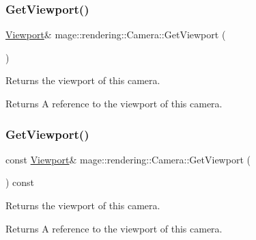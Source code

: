 \subsubsection{\texorpdfstring{Get\+Viewport()}{GetViewport()}\hspace{0.1cm}{\footnotesize\ttfamily [1/2]}}
{\footnotesize\ttfamily \mbox{\hyperlink{classmage_1_1rendering_1_1_viewport}{Viewport}}\& mage\+::rendering\+::\+Camera\+::\+Get\+Viewport (\begin{DoxyParamCaption}{ }\end{DoxyParamCaption})\hspace{0.3cm}{\ttfamily [noexcept]}}

Returns the viewport of this camera.

\begin{DoxyReturn}{Returns}
A reference to the viewport of this camera. 
\end{DoxyReturn}
\mbox{\label{classmage_1_1rendering_1_1_camera_a5d91ec5a395b638140c107a192faa2a3}} 
\subsubsection{\texorpdfstring{Get\+Viewport()}{GetViewport()}\hspace{0.1cm}{\footnotesize\ttfamily [2/2]}}
{\footnotesize\ttfamily const \mbox{\hyperlink{classmage_1_1rendering_1_1_viewport}{Viewport}}\& mage\+::rendering\+::\+Camera\+::\+Get\+Viewport (\begin{DoxyParamCaption}{ }\end{DoxyParamCaption}) const\hspace{0.3cm}{\ttfamily [noexcept]}}

Returns the viewport of this camera.

\begin{DoxyReturn}{Returns}
A reference to the viewport of this camera. 
\end{DoxyReturn}
\mbox{\label{classmage_1_1rendering_1_1_camera_a3aceb5277ca9ea66037de3d5ed44434a}} 
